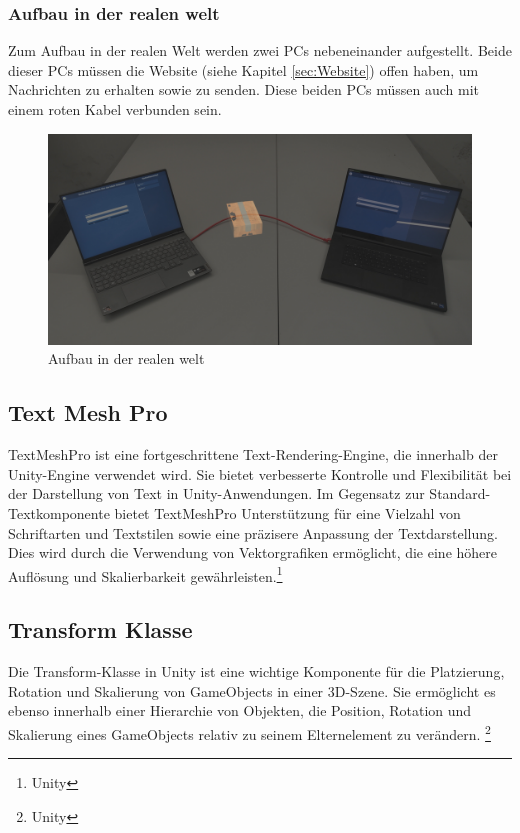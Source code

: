 \subsubsection{Aufbau in der realen welt}
Zum Aufbau in der realen Welt werden zwei PCs nebeneinander aufgestellt. Beide dieser PCs müssen die Website (siehe Kapitel \ref{sec:Website}) offen haben, um Nachrichten zu erhalten sowie zu senden. Diese beiden PCs müssen auch mit einem roten Kabel verbunden sein.
\begin{figure}[H]
    \centering
    \includegraphics[width=1\linewidth]{images/AufbauAnzeige.png}
    \caption{Aufbau in der realen welt}
    \label{fig:NachrichtenaustauschAufbau}
\end{figure}


\subsection{\label{sec:TextMeshPro}Text Mesh Pro}
TextMeshPro ist eine fortgeschrittene Text-Rendering-Engine, die innerhalb der Unity-Engine verwendet wird. Sie bietet verbesserte Kontrolle und Flexibilität bei der Darstellung von Text in Unity-Anwendungen. Im Gegensatz zur Standard-Textkomponente bietet TextMeshPro Unterstützung für eine Vielzahl von Schriftarten und Textstilen sowie eine präzisere Anpassung der Textdarstellung. Dies wird durch die Verwendung von Vektorgrafiken ermöglicht, die eine höhere Auflösung und Skalierbarkeit gewährleisten.\protect\footnote{Unity\cite{TextMeshPro}}


\subsection{\label{sec:Transform}Transform Klasse}
Die Transform-Klasse in Unity ist eine wichtige Komponente für die Platzierung, Rotation und Skalierung von GameObjects in einer 3D-Szene. Sie ermöglicht es ebenso innerhalb einer Hierarchie von Objekten, die Position, Rotation und Skalierung eines GameObjects relativ zu seinem Elternelement zu verändern. \protect\footnote{Unity\cite{Transform}}

